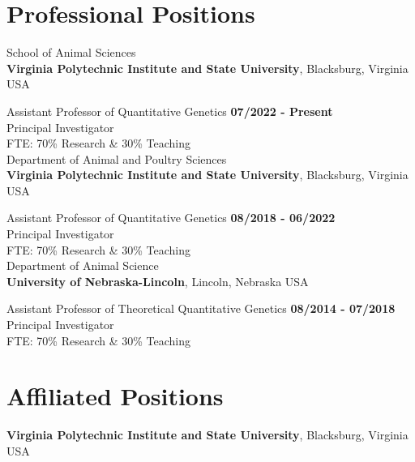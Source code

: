 \documentclass[margin,line,10pt]{res}
\begin{document}
\begin{resume}
\vspace{0.4cm}
\section{\sc Professional Positions}


School of Animal Sciences\\
{\bf Virginia Polytechnic Institute and State University}, Blacksburg, Virginia USA
\vspace{-.3cm}

Assistant Professor of Quantitative Genetics   \hfill {\bf 07/2022 - Present}\\
Principal Investigator \\
FTE: 70\% Research \& 30\% Teaching \\


Department of Animal and Poultry Sciences\\
{\bf Virginia Polytechnic Institute and State University}, Blacksburg, Virginia USA
\vspace{-.3cm}

Assistant Professor of Quantitative Genetics   \hfill {\bf 08/2018 - 06/2022}\\
Principal Investigator \\
FTE: 70\% Research \& 30\% Teaching \\



Department of Animal Science\\
{\bf University of Nebraska-Lincoln}, Lincoln, Nebraska USA
\vspace{-.35cm}

Assistant Professor of Theoretical Quantitative Genetics   \hfill {\bf 08/2014 - 07/2018}\\
Principal Investigator \\
FTE: 70\% Research \& 30\% Teaching \\




\vspace{0.4cm}
\section{\sc Affiliated Positions}
{\bf Virginia Polytechnic Institute and State University}, Blacksburg, Virginia USA


\end{resume}
\end{document}
